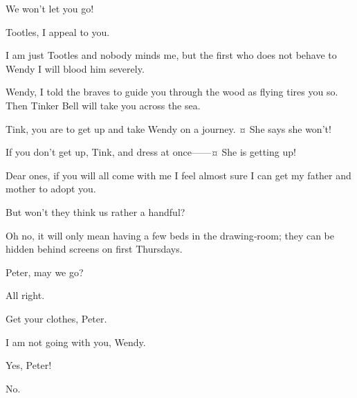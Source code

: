 \begin{drama}
\curlyspeaks
We won’t let you go!

Tootles, I appeal to you.

I am just Tootles and nobody minds me, but the first who does not behave to Wendy I will blood him severely.

Wendy, I told the braves to guide you through the wood as flying tires you so.
Then Tinker Bell will take you across the sea.

Tink, you are to get up and take Wendy on a journey.
¤
She says she won’t!

If you don’t get up, Tink, and dress at once——¤
She is getting up!

Dear ones, if you will all come with me I feel almost sure I can get my father and mother to adopt you.


\nibsspeaks
But won’t they think us rather a handful?

Oh no, it will only mean having a few beds in the drawing‐room; they can be hidden behind screens on first Thursdays.


Peter, may we go?

All right.


Get your clothes, Peter.

I am not going with you, Wendy.

\wendyspeaks
Yes, Peter!

\peterspeaks
No.


\end{drama}
